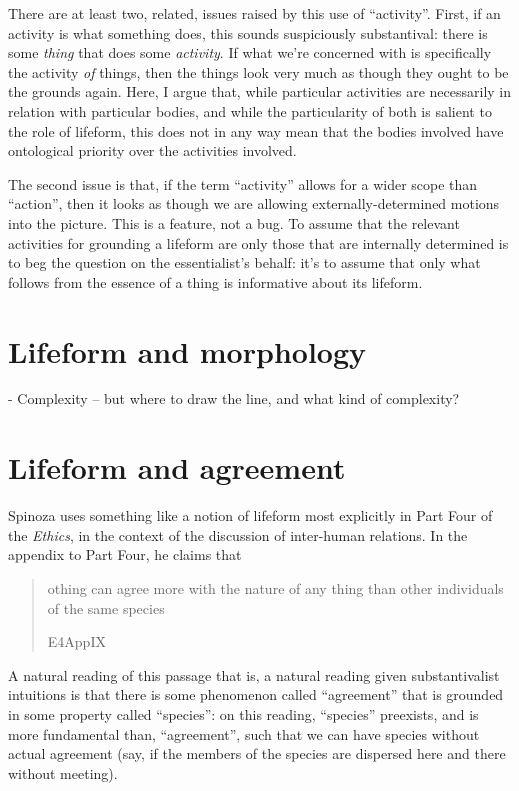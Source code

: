 \documentclass{article}
\newcommand{\dash}{\unskip{—}}
\newcommand\foreign[2]{\foreignlanguage{#1}{\emph{#2}}}
\newcommand\texttitle[1]{\emph{#1}}
\begin{document}
There are at least two, related, issues raised by this use of \enquote{activity}. First, if an activity is what something does, this sounds suspiciously substantival: there is some \emph{thing} that does some \emph{activity}. If what we're concerned with is specifically the activity \emph{of} things, then the things look very much as though they ought to be the grounds again. Here, I argue that, while particular activities are necessarily in relation with particular bodies, and while the particularity of both is salient to the role of lifeform, this does not in any way mean that the bodies involved have ontological priority over the activities involved.

The second issue is that, if the term \enquote{activity} allows for a wider scope than \enquote{action}, then it looks as though we are allowing externally-determined motions into the picture. This is a feature, not a bug. To assume that the relevant activities for grounding a lifeform are only those that are internally determined is to beg the question on the essentialist's behalf: it's to assume that only what follows from the essence of a thing is informative about its lifeform.

\section{Lifeform and morphology}\label{sec:Morphology}

- Complexity – but where to draw the line, and what kind of complexity?

\section{Lifeform and agreement}\label{sec:Agreement}
Spinoza uses something like a notion of lifeform most explicitly in Part Four of the \texttitle{Ethics}, in the context of the discussion of inter-human relations. In the appendix to Part Four, he claims that \blockquote[E4App\RN{9}]{othing can agree \textins{\foreign{latin}{convenire}} more with the nature of any thing than other individuals of the same species}. A natural reading of this passage \dash that is, a natural reading given substantivalist intuitions \dash is that there is some phenomenon called \enquote{agreement} that is grounded in some property called \enquote{species}: on this reading, \enquote{species} preexists, and is more fundamental than, \enquote{agreement}, such that we can have species without actual agreement (say, if the members of the species are dispersed here and there without meeting).
\end{document}
